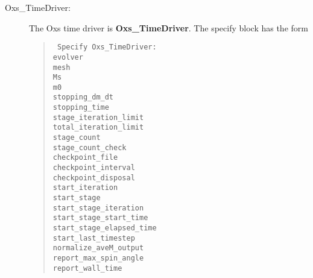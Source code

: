 \begin{description}
\item[Oxs\_TimeDriver:\label{item:TimeDriver}]
%
The Oxs time driver is \textbf{Oxs\_TimeDriver}.  The specify block has
the form
\begin{latexonly}
\begin{quote}\tt
Specify Oxs\_TimeDriver: \ocb\\
 \bi evolver \\
 \bi mesh \\
 \bi Ms \\
 \bi m0 \\
 \bi stopping\_dm\_dt \\
 \bi stopping\_time \\
 \bi stage\_iteration\_limit \\
 \bi total\_iteration\_limit \\
 \bi stage\_count \\
 \bi stage\_count\_check \\
 \bi checkpoint\_file \\
 \bi checkpoint\_interval \\
 \bi checkpoint\_disposal \\
 \bi start\_iteration \\
 \bi start\_stage \\
 \bi start\_stage\_iteration \\
 \bi start\_stage\_start\_time \\
 \bi start\_stage\_elapsed\_time \\
 \bi start\_last\_timestep \\
 \bi normalize\_aveM\_output \\
 \bi report\_max\_spin\_angle \\
 \bi report\_wall\_time \\
\ccb
\end{quote}
\end{latexonly}
\begin{rawhtml}

\end{rawhtml}
\end{description}
